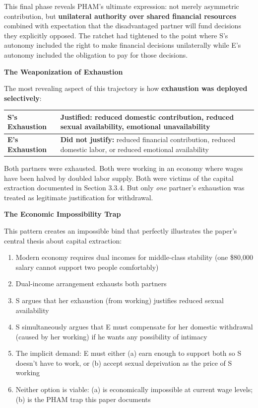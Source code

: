 \documentclass[12pt,openany]{book}
\numberwithin{equation}{chapter}
\begin{document}
This final phase reveals PHAM's ultimate expression: not merely asymmetric contribution, but \textbf{unilateral authority over shared financial resources} combined with expectation that the disadvantaged partner will fund decisions they explicitly opposed. The ratchet had tightened to the point where S's autonomy included the right to make financial decisions unilaterally while E's autonomy included the obligation to pay for those decisions.

\textbf{The Weaponization of Exhaustion}

The most revealing aspect of this trajectory is how \textbf{exhaustion was deployed selectively}:

\begin{center}
\begin{tabular}{|p{2.2in}|p{3in}|}
\hline
\textbf{S's Exhaustion} & \textbf{Justified:} reduced domestic contribution, reduced sexual availability, emotional unavailability \\
\hline
\textbf{E's Exhaustion} & \textbf{Did not justify:} reduced financial contribution, reduced domestic labor, or reduced emotional availability \\
\hline
\end{tabular}
\end{center}

Both partners were exhausted. Both were working in an economy where wages have been halved by doubled labor supply. Both were victims of the capital extraction documented in Section 3.3.4. But only \textit{one} partner's exhaustion was treated as legitimate justification for withdrawal.

\textbf{The Economic Impossibility Trap}

This pattern creates an impossible bind that perfectly illustrates the paper's central thesis about capital extraction:

\begin{enumerate}
    \item Modern economy requires dual incomes for middle-class stability (one \$80,000 salary cannot support two people comfortably)
    \item Dual-income arrangement exhausts both partners
    \item S argues that her exhaustion (from working) justifies reduced sexual availability
    \item S simultaneously argues that E must compensate for her domestic withdrawal (caused by her working) if he wants any possibility of intimacy
    \item The implicit demand: E must either (a) earn enough to support both so S doesn't have to work, or (b) accept sexual deprivation as the price of S working
    \item Neither option is viable: (a) is economically impossible at current wage levels; (b) is the PHAM trap this paper documents
\end{enumerate}
\end{document}

